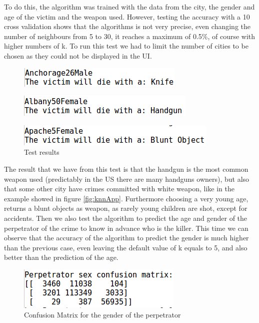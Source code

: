 \documentclass[12pt]{report}
\begin{document}
To do this, the algorithm was trained with the data from the city, the gender     and age of the victim and the weapon used. However, testing the accuracy with a 10 cross validation shows that the algorithms is not very precise, even changing the number of neighbours from 5 to 30, it reaches a maximum of 0.5\%, of course with higher numbers of k. To run this test we had to limit the number of cities to be chosen as they could not be displayed in the UI.
\begin{figure}[!ht]
  \centering
  \includegraphics[width=0.5\linewidth]{../Images/Weapon1.png}
\end{figure}
\begin{figure}[!ht]
  \centering
  \includegraphics[width=0.5\linewidth]{../Images/Weapon2.png}
\end{figure}
\begin{figure}[!ht]
  \centering
  \includegraphics[width=0.5\linewidth]{../Images/Weapon3.png}
  \caption{Test results}
\end{figure}
The result that we have from this test is that the handgun is the most common weapon used (predictably in the US there are many handguns owners), but also that some other city have crimes committed with white weapon, like in the example showed in figure \ref{fig:knnApp}. Furthermore choosing a very young age, returns a blunt objects as weapon, as rarely young children are shot, except for accidents.
\newline
Then we also test the algorithm to predict the age and gender of the perpetrator of the crime to know in advance who is the killer.
This time we can observe that the accuracy of the algorithm to predict the gender is much higher than the previous case, even leaving the default value of k equals to 5, and also better than the prediction of the age.

\begin{figure}[!ht]
  \centering
  \includegraphics[width=0.5\linewidth]{../Images/knnSexConf.png}
  \caption{Confusion Matrix for the gender of the perpetrator}
\end{figure}
\end{document}
